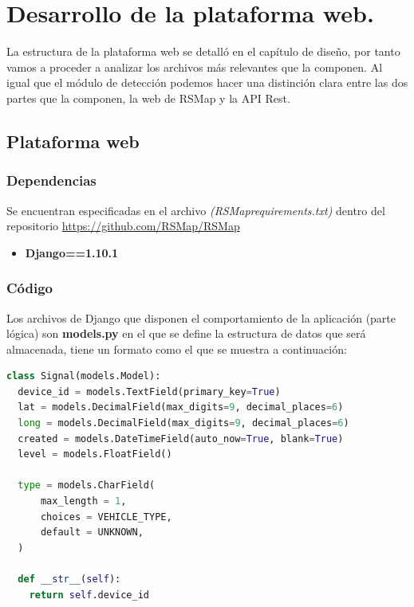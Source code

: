 \newpage


\section{Desarrollo de la plataforma web.}

La estructura de la plataforma web se detalló en el capítulo de diseño, por tanto vamos a proceder a analizar los archivos más relevantes que la componen. Al igual que el módulo de detección podemos hacer una distinción clara entre las dos partes que la componen, la web de RSMap y la API Rest.

\subsection{Plataforma web}

\subsubsection{Dependencias}

Se encuentran especificadas en el archivo \textit{(RSMap\/requirements.txt)} dentro del repositorio \url	{https://github.com/RSMap/RSMap}

\begin{itemize}
	\item \textbf{Django==1.10.1}
\end{itemize}

\subsubsection{Código}

Los archivos de Django que disponen el comportamiento de la aplicación (parte lógica) son \textbf{models.py} en el que se define la estructura de datos que será almacenada, tiene un formato como el que se muestra a continuación:


\begin{lstlisting}[language=python,caption={Modelo definidos en Django},label={lst:pi1}]
class Signal(models.Model):
  device_id = models.TextField(primary_key=True)
  lat = models.DecimalField(max_digits=9, decimal_places=6)
  long = models.DecimalField(max_digits=9, decimal_places=6)
  created = models.DateTimeField(auto_now=True, blank=True)
  level = models.FloatField()

  type = models.CharField(
      max_length = 1,
      choices = VEHICLE_TYPE,
      default = UNKNOWN,
  )

  def __str__(self):
  	return self.device_id
\end{lstlisting}

